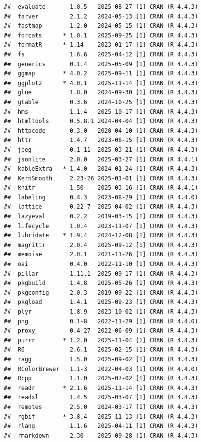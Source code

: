 \documentclass[sn-apa,pdflatex]{sn-jnl}
\begin{document}
\begin{verbatim}
##  evaluate       1.0.5   2025-08-27 [1] CRAN (R 4.4.3)
##  farver         2.1.2   2024-05-13 [1] CRAN (R 4.4.3)
##  fastmap        1.2.0   2024-05-15 [1] CRAN (R 4.4.3)
##  forcats      * 1.0.1   2025-09-25 [1] CRAN (R 4.4.3)
##  formatR      * 1.14    2023-01-17 [1] CRAN (R 4.4.3)
##  fs             1.6.6   2025-04-12 [1] CRAN (R 4.4.3)
##  generics       0.1.4   2025-05-09 [1] CRAN (R 4.4.3)
##  ggmap        * 4.0.2   2025-09-11 [1] CRAN (R 4.4.3)
##  ggplot2      * 4.0.1   2025-11-14 [1] CRAN (R 4.4.3)
##  glue           1.8.0   2024-09-30 [1] CRAN (R 4.4.3)
##  gtable         0.3.6   2024-10-25 [1] CRAN (R 4.4.3)
##  hms            1.1.4   2025-10-17 [1] CRAN (R 4.4.3)
##  htmltools      0.5.8.1 2024-04-04 [1] CRAN (R 4.4.3)
##  httpcode       0.3.0   2020-04-10 [1] CRAN (R 4.4.3)
##  httr           1.4.7   2023-08-15 [1] CRAN (R 4.4.3)
##  jpeg           0.1-11  2025-03-21 [1] CRAN (R 4.4.3)
##  jsonlite       2.0.0   2025-03-27 [1] CRAN (R 4.4.1)
##  kableExtra   * 1.4.0   2024-01-24 [1] CRAN (R 4.4.3)
##  KernSmooth     2.23-26 2025-01-01 [1] CRAN (R 4.4.3)
##  knitr          1.50    2025-03-16 [1] CRAN (R 4.4.1)
##  labeling       0.4.3   2023-08-29 [1] CRAN (R 4.4.0)
##  lattice        0.22-7  2025-04-02 [1] CRAN (R 4.4.3)
##  lazyeval       0.2.2   2019-03-15 [1] CRAN (R 4.4.3)
##  lifecycle      1.0.4   2023-11-07 [1] CRAN (R 4.4.3)
##  lubridate    * 1.9.4   2024-12-08 [1] CRAN (R 4.4.3)
##  magrittr       2.0.4   2025-09-12 [1] CRAN (R 4.4.3)
##  memoise        2.0.1   2021-11-26 [1] CRAN (R 4.4.3)
##  oai            0.4.0   2022-11-10 [1] CRAN (R 4.4.3)
##  pillar         1.11.1  2025-09-17 [1] CRAN (R 4.4.3)
##  pkgbuild       1.4.8   2025-05-26 [1] CRAN (R 4.4.3)
##  pkgconfig      2.0.3   2019-09-22 [1] CRAN (R 4.4.3)
##  pkgload        1.4.1   2025-09-23 [1] CRAN (R 4.4.3)
##  plyr           1.8.9   2023-10-02 [1] CRAN (R 4.4.3)
##  png            0.1-8   2022-11-29 [1] CRAN (R 4.4.0)
##  proxy          0.4-27  2022-06-09 [1] CRAN (R 4.4.3)
##  purrr        * 1.2.0   2025-11-04 [1] CRAN (R 4.4.3)
##  R6             2.6.1   2025-02-15 [1] CRAN (R 4.4.3)
##  ragg           1.5.0   2025-09-02 [1] CRAN (R 4.4.3)
##  RColorBrewer   1.1-3   2022-04-03 [1] CRAN (R 4.4.0)
##  Rcpp           1.1.0   2025-07-02 [1] CRAN (R 4.4.3)
##  readr        * 2.1.6   2025-11-14 [1] CRAN (R 4.4.3)
##  readxl         1.4.5   2025-03-07 [1] CRAN (R 4.4.3)
##  remotes        2.5.0   2024-03-17 [1] CRAN (R 4.4.3)
##  rgbif        * 3.8.4   2025-11-13 [1] CRAN (R 4.4.3)
##  rlang          1.1.6   2025-04-11 [1] CRAN (R 4.4.3)
##  rmarkdown      2.30    2025-09-28 [1] CRAN (R 4.4.3)

\end{verbatim}
\end{document}
